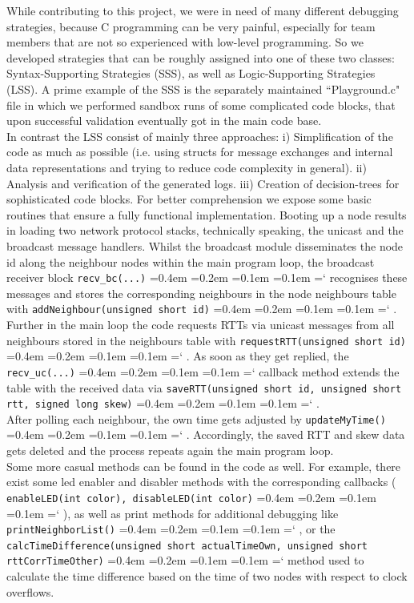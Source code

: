\documentclass{llncs}
\newcommand{\code}[1]{%
    \texttt{#1}%
    \fontdimen2\font=0.4em
    \fontdimen3\font=0.2em
    \fontdimen4\font=0.1em
    \fontdimen7\font=0.1em
    \hyphenchar\font=`\-
}
\begin{document}
\noindent While contributing to this project, we were in need of many different debugging strategies, because C programming can be very painful, especially for team members that are not so experienced with low-level programming. So we developed strategies that can be roughly assigned into one of these two classes: Syntax-Supporting Strategies (SSS), as well as Logic-Supporting Strategies (LSS). A prime example of the SSS is the separately maintained ``Playground.c" file in which we performed sandbox runs of some complicated code blocks, that upon successful validation eventually got in the main code base.\\
\indent In contrast the LSS consist of mainly three approaches: i) Simplification of the code as much as possible (i.e. using structs for message exchanges and internal data representations and trying to reduce code complexity in general). ii) Analysis and verification of the generated logs. iii) Creation of decision-trees for sophisticated code blocks.\bigbreak
\noindent For better comprehension we expose some basic routines that ensure a fully functional implementation. Booting up a node results in loading two network protocol stacks, technically speaking, the unicast and the broadcast message handlers. Whilst the broadcast module disseminates the node id along the neighbour nodes within the main program loop, the broadcast receiver block \code{recv\_bc(...)} recognises these messages and stores the corresponding neighbours in the node neighbours table with \code{addNeighbour(unsigned short id)}. Further in the main loop the code requests RTTs via unicast messages from all neighbours stored in the neighbours table with \code{requestRTT(unsigned short id)}. As soon as they get replied, the \code{recv\_uc(...)} callback method extends the table with the received data via \code{saveRTT(unsigned short id, unsigned short rtt, signed long skew)}.\\
After polling each neighbour, the own time gets adjusted by \code{updateMyTime()}. Accordingly, the saved RTT and skew data gets deleted and the process repeats again the main program loop.\\
\indent Some more casual methods can be found in the code as well. For example, there exist some led enabler and disabler methods with the corresponding callbacks (\code{enableLED(int color), disableLED(int color)}), as well as print methods for additional debugging like \code{print\-Neighbor\-List()}, or the \code{calcTimeDifference(unsigned short actualTime\-Own, unsigned short rttCorrTimeOther)} method used to calculate the time difference based on the time of two nodes with respect to clock overflows.
\end{document}
